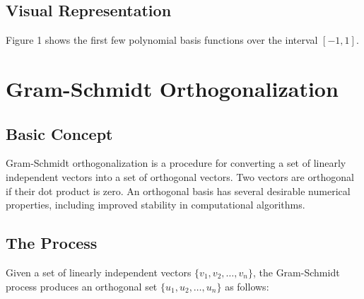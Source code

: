 \documentclass{article}
\begin{document}
\subsection{Visual Representation}

Figure 1 shows the first few polynomial basis functions over the interval $[-1, 1]$.

\begin{center}
\end{center}

\section{Gram-Schmidt Orthogonalization}

\subsection{Basic Concept}

Gram-Schmidt orthogonalization is a procedure for converting a set of linearly independent vectors into a set of orthogonal vectors. Two vectors are orthogonal if their dot product is zero. An orthogonal basis has several desirable numerical properties, including improved stability in computational algorithms.

\subsection{The Process}

Given a set of linearly independent vectors $\{v_1, v_2, \ldots, v_n\}$, the Gram-Schmidt process produces an orthogonal set $\{u_1, u_2, \ldots, u_n\}$ as follows:
\end{document}
